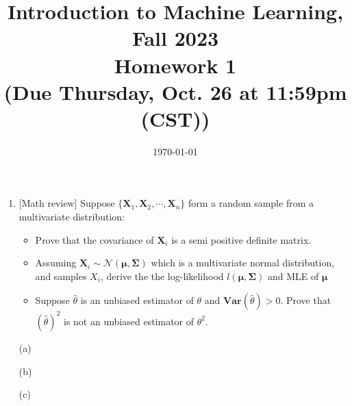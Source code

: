 \documentclass[10pt]{article}
\begin{document}
\date{\today}
\title{Introduction to Machine Learning, Fall 2023 \\
	Homework 1\\
	\small (Due Thursday, Oct. 26 at 11:59pm (CST))}
\maketitle
\begin{enumerate}[1.]


	\item {} [Math review] Suppose $\{\mathbf{X}_1, \mathbf{X}_2, \cdots, \mathbf{X}_n\}$ form a random sample from a multivariate distribution:
	      \begin{itemize}
		      \item[(a)] Prove that the covariance of $\mathbf{X}_i$ is a semi positive definite matrix. ~
		      \item[(b)] Assuming $\mathbf{X}_i\sim \mathcal{N}(\mathbf{\mu},\mathbf{\Sigma})$ which is a multivariate normal distribution, and samples $X_i$, derive the the log-likelihood $\mathit{l}(\mathbf{\mu},\mathbf{\Sigma})$ and MLE of $\mathbf{\mu}$ ~
		      \item[(c)] Suppose $\hat{\theta}$ is an unbiased estimator of $\theta$ and $\mathbf{Var}(\hat{\theta})>0$. Prove that $(\hat{\theta})^2$ is not an unbiased estimator of $\theta^2$. ~
	      \end{itemize}
		
(a) 


(b) 



(c)



	      \newpage


\end{enumerate}
\end{document}
